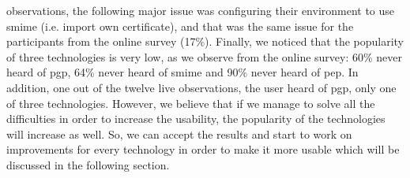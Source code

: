 observations, the following major issue was configuring their environment to use \acrshort{smime} (i.e. import own certificate), and that was the same issue for the participants from the online survey (17\%). Finally, we noticed that the popularity of three technologies is very low, as we observe from the online survey: 60\% never heard of \acrshort{pgp}, 64\% never heard of \acrshort{smime} and 90\% never
heard of \acrshort{pep}. In addition, one out of the twelve live observations, the user heard of \acrshort{pgp}, only one of three technologies. However, we believe that if we manage to solve all the difficulties in order to increase the usability, the popularity of the technologies will increase as well. So, we can accept the results and start to work on improvements for every technology in order to make
it more usable which will be discussed in the following section.

